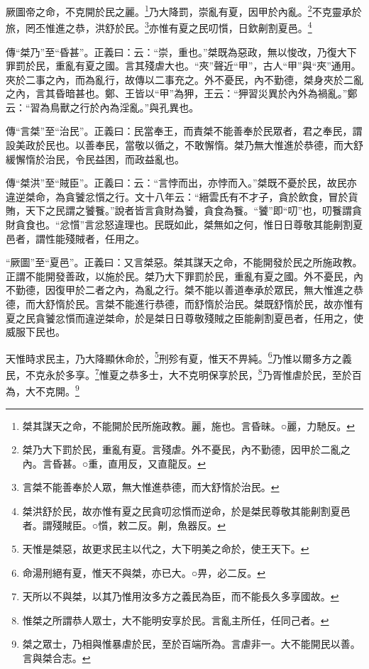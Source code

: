 厥圖帝之命，不克開於民之麗。\footnote{桀其謀天之命，不能開於民所施政教。麗，施也。言昏昧。○麗，力馳反。}乃大降罰，崇亂有夏，因甲於內亂。\footnote{桀乃大下罰於民，重亂有夏。言殘虐。外不憂民，內不勤德，因甲於二亂之內。言昏甚。○重，直用反，又直龍反。}不克靈承於旅，罔丕惟進之恭，洪舒於民。\footnote{言桀不能善奉於人眾，無大惟進恭德，而大舒惰於治民。}亦惟有夏之民叨懫，日欽劓割夏邑。\footnote{桀洪舒於民，故亦惟有夏之民貪叨忿懫而逆命，於是桀民尊敬其能劓割夏邑者。謂殘賊臣。○懫，敕二反。劓，魚器反。}


{\noindent\zhuan{}\fzbyks 傳“桀乃”至“昏甚”。正義曰：云：“崇，重也。”桀既為惡政，無以悛改，乃復大下罪罰於民，重亂有夏之國。言其殘虐大也。“夾”聲近“甲”，古人“甲”與“夾”通用。夾於二事之內，而為亂行，故傳以二事充之。外不憂民，內不勤德，桀身夾於二亂之內，言其昏暗甚也。鄭、王皆以“甲”為狎，王云：“狎習災異於內外為禍亂。”鄭云：“習為鳥獸之行於內為淫亂。”與孔異也。 \par}

{\noindent\zhuan{}\fzbyks 傳“言桀”至“治民”。正義曰：民當奉王，而責桀不能善奉於民眾者，君之奉民，謂設美政於民也。以善奉民，當敬以循之，不敢懈惰。桀乃無大惟進於恭德，而大舒緩懈惰於治民，令民益困，而政益亂也。 \par}

{\noindent\zhuan{}\fzbyks 傳“桀洪”至“賊臣”。正義曰：云：“言悖而出，亦悖而入。”桀既不憂於民，故民亦違逆桀命，為貪饕忿懫之行。文十八年云：“縉雲氏有不才子，貪於飲食，冒於貨賄，天下之民謂之饕餮。”說者皆言貪財為饕，貪食為餮。“饕”即“叨”也，叨餮謂貪財貪食也。“忿懫”言忿怒違理也。民既如此，桀無如之何，惟日日尊敬其能劓割夏邑者，謂性能殘賊者，任用之。 \par}

{\noindent\shu{}\fzkt “厥圖”至“夏邑”。正義曰：又言桀惡。桀其謀天之命，不能開發於民之所施政教。正謂不能開發善政，以施於民。桀乃大下罪罰於民，重亂有夏之國。外不憂民，內不勤德，因復甲於二者之內，為亂之行。桀不能以善道奉承於眾民，無大惟進之恭德，而大舒惰於民。言桀不能進行恭德，而舒惰於治民。桀既舒惰於民，故亦惟有夏之民貪饕忿懫而違逆桀命，於是桀日日尊敬殘賊之臣能劓割夏邑者，任用之，使威服下民也。 \par}

天惟時求民主，乃大降顯休命於，\footnote{天惟是桀惡，故更求民主以代之，大下明美之命於，使王天下。}刑殄有夏，惟天不畀純。\footnote{命湯刑絕有夏，惟天不與桀，亦已大。○畀，必二反。}乃惟以爾多方之義民，不克永於多享。\footnote{天所以不與桀，以其乃惟用汝多方之義民為臣，而不能長久多享國故。}惟夏之恭多士，大不克明保享於民，\footnote{惟桀之所謂恭人眾士，大不能明安享於民。言亂主所任，任同己者。}乃胥惟虐於民，至於百為，大不克開。\footnote{桀之眾士，乃相與惟暴虐於民，至於百端所為。言虐非一。大不能開民以善。言與桀合志。}


